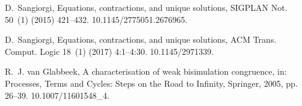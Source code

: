 \documentclass[GCNS]{yincog}
\theoremstyle{remark}
\theoremstyle{theorem}
\theoremstyle{remark}
\begin{document}
\begin{backmatter}
\begin{thebibliography}{}
\begin{bsubitem}
\begin{bcontribution}%
\end{bcontribution}
\begin{bhost}
\begin{bissue}
\end{bissue}
\end{bhost}
\end{bsubitem}
%
\OrigBibText
D.~Sangiorgi, Equations, contractions, and unique solutions, SIGPLAN Not.
50~(1) (2015) 421--432. 10.1145/2775051.2676965.
\endOrigBibText
{}%
\endbibitem

\begin{bsubitem}
\begin{bcontribution}%
\end{bcontribution}
\begin{bhost}
\begin{bissue}
\end{bissue}
\end{bhost}
\end{bsubitem}
%
\OrigBibText
D.~Sangiorgi, Equations, contractions, and unique solutions, ACM Trans.
Comput. Logic 18~(1) (2017) 4:1--4:30. 10.1145/2971339.
\endOrigBibText
{}%
\endbibitem

\begin{bsubitem}
\begin{bcontribution}%
\end{bcontribution}
\begin{bhost}
\begin{beditedbook}
\end{beditedbook}
\end{bhost}
\end{bsubitem}
%
\OrigBibText
R.~J. van Glabbeek, A characterisation of weak bisimulation congruence,
in: Processes, Terms and Cycles: Steps on the Road to Infinity, Springer,
2005, pp. 26--39. 10.1007/11601548\_4.
\endOrigBibText
{}%
\endbibitem


\end{thebibliography}
\end{backmatter}
\end{document}

